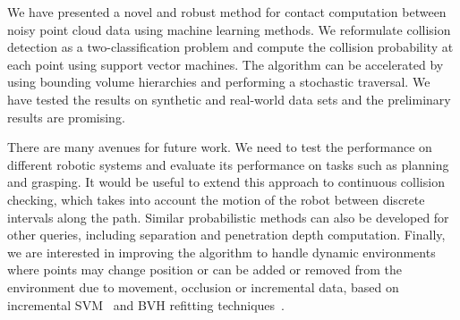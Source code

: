 We have presented a novel and robust method for contact computation between noisy point cloud data using machine learning methods.
We reformulate collision detection as a two-classification problem and compute the collision probability at each point using
support vector machines. The algorithm can be accelerated by using bounding volume hierarchies and performing a stochastic traversal. We have tested
the results on synthetic and real-world data sets and the preliminary results are promising.

There are many avenues for future work. We need to test the performance on different robotic systems and evaluate its performance
on tasks such as planning and grasping.
It would be useful to extend this approach to continuous collision checking, which takes into account the motion of the robot
between discrete intervals along the path. Similar probabilistic methods can also be developed for other queries,
including separation and penetration depth computation. Finally, we are interested in improving the algorithm to handle dynamic environments where points may change position or can be added or removed from the environment due to movement, occlusion or incremental data, based on incremental SVM~\cite{Gert:nips:2001} and BVH refitting techniques~\cite{Lauterbach10}.

